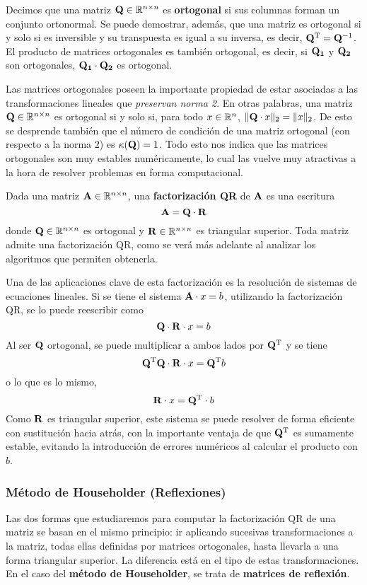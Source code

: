 Decimos que una matriz $\mathbf{Q} \in \mathbb{R}^{n \times n}$ es \textbf{ortogonal}
si sus columnas forman un conjunto ortonormal. Se puede demostrar, además, que
una matriz es ortogonal si y solo si es inversible y su transpuesta es igual a
su inversa, es decir, $\mathbf{Q}^{\mathrm{T}} = \mathbf{Q}^{-1}$. El producto de matrices
ortogonales es también ortogonal, es decir, si $\mathbf{Q_1}$ y $\mathbf{Q_2}$ son
ortogonales, $\mathbf{Q_1} \cdot \mathbf{Q_2}$ es ortogonal.

Las matrices ortogonales poseen la importante propiedad de estar asociadas a
las
transformaciones lineales que \emph{preservan norma 2}. En otras palabras, una
matriz $\mathbf{Q} \in \mathbb{R}^{n \times n}$ es ortogonal si y solo si, para todo
$x \in \mathbb{R}^n$, $\lVert \mathbf{Q} \cdot x \rVert_2 = \lVert x \rVert_2$.
De esto se desprende también que el número de condición de una matriz
ortogonal (con respecto a la norma 2) es $\kappa(\mathbf{Q}) = 1$. Todo esto nos
indica que las matrices ortogonales son muy estables numéricamente, lo cual
las vuelve muy atractivas a la hora de resolver problemas en forma
computacional.


Dada una matriz $\mathbf{A} \in \mathbb{R}^{n \times n}$, una \textbf{factorización QR} de $\mathbf{A}$ es una escritura
\[ \mathbf{A} = \mathbf{Q} \cdot \mathbf{R} \]
donde $\mathbf{Q} \in \mathbb{R}^{n \times n}$ es ortogonal y
$\mathbf{R} \in \mathbb{R}^{n \times n}$ es triangular superior. Toda matriz admite
una factorización QR, como se verá más adelante al analizar los algoritmos
que permiten obtenerla.

Una de las aplicaciones clave de esta factorización es la resolución
de sistemas de ecuaciones lineales. Si se tiene el sistema $\mathbf{A} \cdot x =
b$, utilizando la factorización QR, se lo puede reescribir como
\[\mathbf{Q} \cdot \mathbf{R} \cdot x = b\]
Al ser $\mathbf{Q}$ ortogonal, se puede multiplicar
a ambos lados por $\mathbf{Q}^{\mathrm{T}}$ y se tiene
\[\mathbf{Q}^{\mathrm{T}} \mathbf{Q} \cdot \mathbf{R} \cdot x = \mathbf{Q}^{\mathrm{T}} b\]
o lo que es lo mismo,
\[\mathbf{R} \cdot x = \mathbf{Q}^{\mathrm{T}} \cdot b\]
Como $\mathbf{R}$ es triangular superior, este sistema se puede resolver de forma
eficiente con sustitución hacia atrás, con la importante ventaja de que
$\mathbf{Q}^{\mathrm{T}}$ es sumamente estable, evitando la introducción de errores
numéricos al calcular el producto con $b$.

\subsubsection{Método de Householder (Reflexiones)}
Las dos formas que estudiaremos para computar la factorización QR de una
matriz se basan en el mismo principio: ir aplicando sucesivas transformaciones
a la matriz, todas ellas definidas por matrices ortogonales, hasta llevarla
a una forma triangular superior. La diferencia está en el tipo de estas
transformaciones. En el caso del \textbf{método de Householder}, se trata
de \textbf{matrices de reflexión}.

